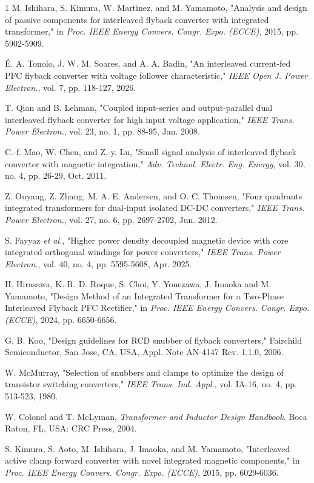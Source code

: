 \documentclass[lettersize,journal]{IEEEtran}
\begin{document}
\begin{thebibliography}{1}
M. Ishihara, S. Kimura, W. Martinez, and M. Yamamoto, "Analysis and design of passive components for interleaved flyback converter with integrated transformer," in \textit{Proc. IEEE Energy Convers. Congr. Expo. (ECCE)}, 2015, pp. 5902-5909.

É. A. Tonolo, J. W. M. Soares, and A. A. Badin, "An interleaved current-fed PFC flyback converter with voltage follower characteristic," \textit{IEEE Open J. Power Electron.}, vol. 7, pp. 118-127, 2026.

T. Qian and B. Lehman, "Coupled input-series and output-parallel dual interleaved flyback converter for high input voltage application," \textit{IEEE Trans. Power Electron.}, vol. 23, no. 1, pp. 88-95, Jan. 2008.

C.-f. Mao, W. Chen, and Z.-y. Lu, "Small signal analysis of interleaved flyback converter with magnetic integration," \textit{Adv. Technol. Electr. Eng. Energy}, vol. 30, no. 4, pp. 26-29, Oct. 2011.


Z. Ouyang, Z. Zhang, M. A. E. Andersen, and O. C. Thomsen, "Four quadrants integrated transformers for dual-input isolated DC-DC converters," \textit{IEEE Trans. Power Electron.}, vol. 27, no. 6, pp. 2697-2702, Jun. 2012.

S. Fayyaz \textit{et al.}, "Higher power density decoupled magnetic device with core integrated orthogonal windings for power converters," \textit{IEEE Trans. Power Electron.}, vol. 40, no. 4, pp. 5595-5608, Apr. 2025.


H. Hirasawa, K. R. D. Roque, S. Choi, Y. Yonezawa, J. Imaoka and M. Yamamoto, "Design Method of an Integrated Transformer for a Two-Phase Interleaved Flyback PFC Rectifier," in \textit{Proc. IEEE Energy Convers. Congr. Expo. (ECCE)}, 2024, pp. 6650-6656.

G. B. Koo, "Design guidelines for RCD snubber of flyback converters," Fairchild Semiconductor, San Jose, CA, USA, Appl. Note AN-4147 Rev. 1.1.0, 2006.

W. McMurray, "Selection of snubbers and clamps to optimize the design of transistor switching converters," \textit{IEEE Trans. Ind. Appl.}, vol. IA-16, no. 4, pp. 513-523, 1980.

W. Colonel and T. McLyman, \textit{Transformer and Inductor Design Handbook}. Boca Raton, FL, USA: CRC Press, 2004.

S. Kimura, S. Aoto, M. Ishihara, J. Imaoka, and M. Yamamoto, "Interleaved active clamp forward converter with novel integrated magnetic components," in \textit{Proc. IEEE Energy Convers. Congr. Expo. (ECCE)}, 2015, pp. 6029-6036.

\end{thebibliography}
\end{document}
